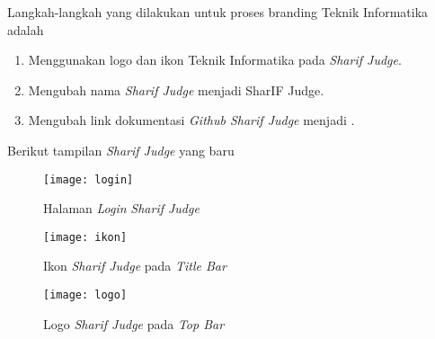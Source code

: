 Langkah-langkah yang dilakukan untuk proses branding Teknik Informatika adalah
\begin{enumerate}
	\item Menggunakan logo dan ikon Teknik Informatika pada \textit{Sharif Judge}.
	\item Mengubah nama \textit{Sharif Judge} menjadi SharIF Judge.
	\item Mengubah link dokumentasi \textit{Github Sharif Judge} menjadi .
\end{enumerate}

Berikut tampilan \textit{Sharif Judge} yang baru
\begin{figure}[H]
	\centering  
	\texttt{[image: login]}  
	\caption[Halaman \textit{Login} \textit{Sharif Judge}]{Halaman \textit{Login} \textit{Sharif Judge}} 
	\label{fig:login} 
\end{figure}

\begin{figure}[H]
	\centering  
	\texttt{[image: ikon]}  
	\caption[Ikon \textit{Sharif Judge} pada \textit{Title Bar}]{Ikon \textit{Sharif Judge} pada \textit{Title Bar}} 
	\label{fig:ikon} 
\end{figure} 

\begin{figure}[H]
	\centering  
	\texttt{[image: logo]}  
	\caption[Logo \textit{Sharif Judge} pada \textit{Top Bar}]{Logo \textit{Sharif Judge} pada \textit{Top Bar}} 
	\label{fig:logo} 
\end{figure} 